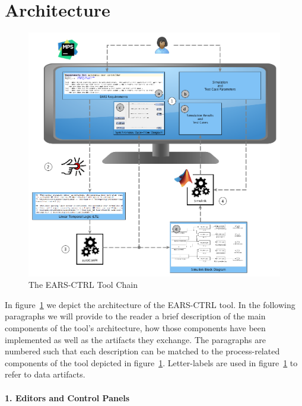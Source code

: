 \section{Architecture}

\begin{figure}[t]
   \begin{center}
     \includegraphics[width=1\textwidth]{images/toolchain.png}
     \caption{The \textsf{EARS-CTRL} Tool Chain}
     \label{fig:ears_ctrl_toolchain}
   \end{center}
 \end{figure}
 
In figure~\ref{fig:ears_ctrl_toolchain} we depict the architecture of the
\textsf{EARS-CTRL} tool. In the following paragraphs we will provide to the
reader a brief description of the main components of the tool's architecture, how those
components have been implemented as well as the artifacts they exchange. The
paragraphs are numbered such that each description can be matched to the 
process-related components of the tool depicted in
figure~\ref{fig:ears_ctrl_toolchain}. 
Letter-labels are used in figure~\ref{fig:ears_ctrl_toolchain} to refer to data
artifacts.
 
\paragraph{1. Editors and Control Panels\\\\} 

